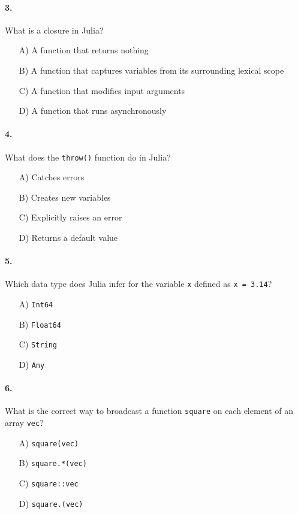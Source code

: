 \documentclass{article}
\begin{document}
\medskip
\noindent
\paragraph{3.} What is a closure in Julia?
\begin{itemize}
    \item[A)] A function that returns nothing
    \item[B)] A function that captures variables from its surrounding lexical scope
    \item[C)] A function that modifies input arguments
    \item[D)] A function that runs asynchronously
\end{itemize}

\medskip
\noindent
\paragraph{4.} What does the \texttt{throw()} function do in Julia?
\begin{itemize}
    \item[A)] Catches errors
    \item[B)] Creates new variables
    \item[C)] Explicitly raises an error
    \item[D)] Returns a default value
\end{itemize}

\medskip
\noindent
\paragraph{5.} Which data type does Julia infer for the variable \texttt{x} defined as \texttt{x = 3.14}?
\begin{itemize}
    \item[A)] \texttt{Int64}
    \item[B)] \texttt{Float64}
    \item[C)] \texttt{String}
    \item[D)] \texttt{Any}
\end{itemize}

\medskip
\noindent
\paragraph{6.} What is the correct way to broadcast a function \texttt{square} on each element of an array \texttt{vec}?
\begin{itemize}
    \item[A)] \texttt{square(vec)}
    \item[B)] \texttt{square.*(vec)}
    \item[C)] \texttt{square::vec}
    \item[D)] \texttt{square.(vec)}
\end{itemize}
\end{document}
